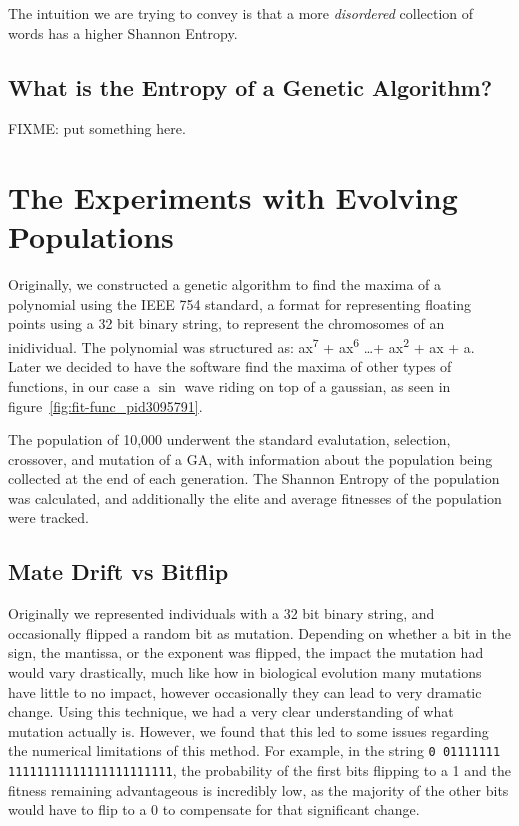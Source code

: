 \documentclass[11pt]{article}
\begin{document}
The intuition we are trying to convey is that a more \emph{disordered}
collection of words has a higher Shannon Entropy.


\subsection{What is the Entropy of a Genetic Algorithm?}

FIXME: put something here.

\section{The Experiments with Evolving Populations}

Originally, we constructed a genetic algorithm to find the maxima of a
polynomial using the IEEE 754 standard, a format for 
representing floating points using a 32 bit binary string, to represent the
chromosomes of an inidividual. The polynomial was structured as:
ax\textsuperscript{7} + ax\textsuperscript{6} \ldots +
ax\textsuperscript{2} + ax + a. Later we decided to have the software
find the maxima of other types of functions, in our case a $\sin$ wave
riding on top of a gaussian, as seen in figure~\ref{fig:fit-func_pid3095791}.


The population of 10,000 underwent the standard evalutation,
selection, crossover, and mutation of a GA, with information about the
population being collected at the end of each generation. The Shannon 
Entropy of the population was calculated, and additionally the elite and average
fitnesses of the population were tracked.

\subsection{Mate Drift vs Bitflip}

Originally we represented individuals with a 32 bit binary string, and
occasionally flipped a random bit as mutation. Depending on whether a
bit in the sign, the mantissa, or the exponent was flipped, the impact
the mutation had would vary drastically, much like how in biological
evolution many mutations have little to no impact, however
occasionally they can lead to very dramatic change. Using this
technique, we had a very clear understanding of what mutation actually
is. However, we found that this led to some issues regarding the
numerical limitations of this method. For example, in the string
\texttt{0 01111111 11111111111111111111111}, the probability of the
first bits flipping to a 1 and the fitness remaining advantageous is
incredibly low, as the majority of the other bits would have to flip
to a 0 to compensate for that significant change.
\end{document}
